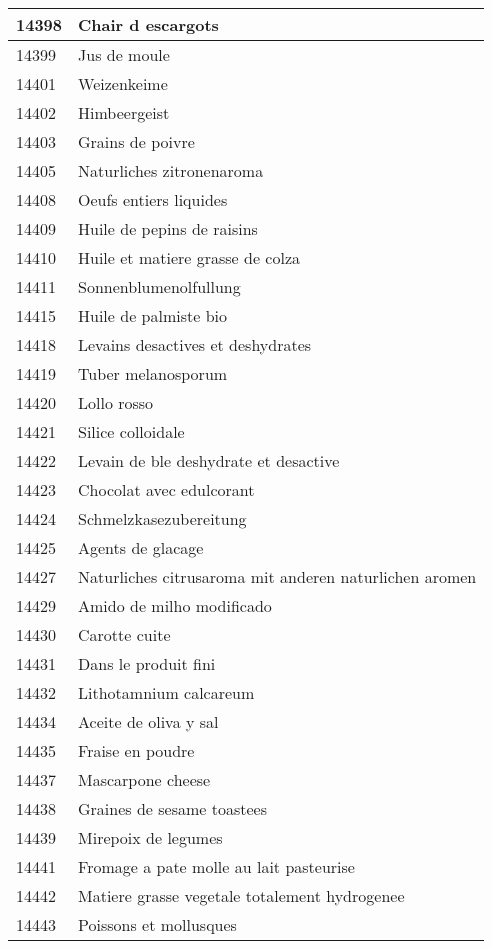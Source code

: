 \begin{longtable}{|l|l|}
14398 & Chair d escargots \\ \hline 
14399 & Jus de moule \\ \hline 
14401 & Weizenkeime \\ \hline 
14402 & Himbeergeist \\ \hline 
14403 & Grains de poivre \\ \hline 
14405 & Naturliches zitronenaroma \\ \hline 
14408 & Oeufs entiers liquides \\ \hline 
14409 & Huile de pepins de raisins \\ \hline 
14410 & Huile et matiere grasse de colza \\ \hline 
14411 & Sonnenblumenolfullung \\ \hline 
14415 & Huile de palmiste bio \\ \hline 
14418 & Levains desactives et deshydrates \\ \hline 
14419 & Tuber melanosporum \\ \hline 
14420 & Lollo rosso \\ \hline 
14421 & Silice colloidale \\ \hline 
14422 & Levain de ble deshydrate et desactive \\ \hline 
14423 & Chocolat avec edulcorant \\ \hline 
14424 & Schmelzkasezubereitung \\ \hline 
14425 & Agents de glacage \\ \hline 
14427 & Naturliches citrusaroma mit anderen naturlichen aromen \\ \hline 
14429 & Amido de milho modificado \\ \hline 
14430 & Carotte cuite \\ \hline 
14431 & Dans le produit fini \\ \hline 
14432 & Lithotamnium calcareum \\ \hline 
14434 & Aceite de oliva y sal \\ \hline 
14435 & Fraise en poudre \\ \hline 
14437 & Mascarpone cheese \\ \hline 
14438 & Graines de sesame toastees \\ \hline 
14439 & Mirepoix de legumes \\ \hline 
14441 & Fromage a pate molle au lait pasteurise \\ \hline 
14442 & Matiere grasse vegetale totalement hydrogenee \\ \hline 
14443 & Poissons et mollusques \\ \hline 

\end{longtable}
